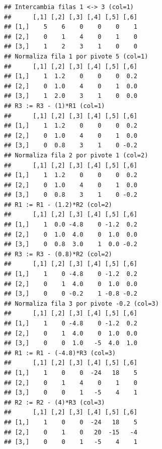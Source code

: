 \documentclass[
]{book}
\newenvironment{Shaded}{\begin{snugshade}}{\end{snugshade}}
\newcommand{\AttributeTok}[1]{\textcolor[rgb]{0.13,0.29,0.53}{#1}}
\newcommand{\ConstantTok}[1]{\textcolor[rgb]{0.56,0.35,0.01}{#1}}
\newcommand{\DecValTok}[1]{\textcolor[rgb]{0.00,0.00,0.81}{#1}}
\newcommand{\FloatTok}[1]{\textcolor[rgb]{0.00,0.00,0.81}{#1}}
\newcommand{\FunctionTok}[1]{\textcolor[rgb]{0.13,0.29,0.53}{\textbf{#1}}}
\newcommand{\NormalTok}[1]{#1}
\newcommand{\OtherTok}[1]{\textcolor[rgb]{0.56,0.35,0.01}{#1}}
\newcommand{\SpecialCharTok}[1]{\textcolor[rgb]{0.81,0.36,0.00}{\textbf{#1}}}
\begin{document}
\begin{Shaded}
\end{Shaded}

\begin{verbatim}
## Intercambia filas 1 <-> 3 (col=1)
##      [,1] [,2] [,3] [,4] [,5] [,6]
## [1,]    5    6    0    0    0    1
## [2,]    0    1    4    0    1    0
## [3,]    1    2    3    1    0    0
## Normaliza fila 1 por pivote 5 (col=1)
##      [,1] [,2] [,3] [,4] [,5] [,6]
## [1,]    1  1.2    0    0    0  0.2
## [2,]    0  1.0    4    0    1  0.0
## [3,]    1  2.0    3    1    0  0.0
## R3 := R3 - (1)*R1 (col=1)
##      [,1] [,2] [,3] [,4] [,5] [,6]
## [1,]    1  1.2    0    0    0  0.2
## [2,]    0  1.0    4    0    1  0.0
## [3,]    0  0.8    3    1    0 -0.2
## Normaliza fila 2 por pivote 1 (col=2)
##      [,1] [,2] [,3] [,4] [,5] [,6]
## [1,]    1  1.2    0    0    0  0.2
## [2,]    0  1.0    4    0    1  0.0
## [3,]    0  0.8    3    1    0 -0.2
## R1 := R1 - (1.2)*R2 (col=2)
##      [,1] [,2] [,3] [,4] [,5] [,6]
## [1,]    1  0.0 -4.8    0 -1.2  0.2
## [2,]    0  1.0  4.0    0  1.0  0.0
## [3,]    0  0.8  3.0    1  0.0 -0.2
## R3 := R3 - (0.8)*R2 (col=2)
##      [,1] [,2] [,3] [,4] [,5] [,6]
## [1,]    1    0 -4.8    0 -1.2  0.2
## [2,]    0    1  4.0    0  1.0  0.0
## [3,]    0    0 -0.2    1 -0.8 -0.2
## Normaliza fila 3 por pivote -0.2 (col=3)
##      [,1] [,2] [,3] [,4] [,5] [,6]
## [1,]    1    0 -4.8    0 -1.2  0.2
## [2,]    0    1  4.0    0  1.0  0.0
## [3,]    0    0  1.0   -5  4.0  1.0
## R1 := R1 - (-4.8)*R3 (col=3)
##      [,1] [,2] [,3] [,4] [,5] [,6]
## [1,]    1    0    0  -24   18    5
## [2,]    0    1    4    0    1    0
## [3,]    0    0    1   -5    4    1
## R2 := R2 - (4)*R3 (col=3)
##      [,1] [,2] [,3] [,4] [,5] [,6]
## [1,]    1    0    0  -24   18    5
## [2,]    0    1    0   20  -15   -4
## [3,]    0    0    1   -5    4    1
\end{verbatim}
\end{document}

